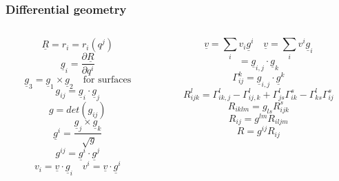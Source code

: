 \documentclass[first,firstsupp,lastsupp,handout,last,hyperref,table]{ETHclass}
\begin{document}
\begin{frame}[t]
\frametitle{Differential geometry}
\vspace{-0.1cm}
\centering
{\footnotesize
\begin{columns}
\begin{column}{0.5\textwidth}
\begin{equation*}
\underline{R}=r_{i}=r_{i}(q^{j})
\end{equation*}
\begin{equation*}
\underline{g}_{i}=\frac{\partial\underline{R}}{\partial q^{i}}
\end{equation*}
\begin{equation*}
\underline{g}_{3}=\underline{g}_{1}\times\underline{g}_{2}\quad\text{for surfaces}
\end{equation*}
\begin{equation*}
g_{ij}=\underline{g}_{i}\cdotp\underline{g}_{j}
\end{equation*}
\begin{equation*}
g=det(g_{ij})
\end{equation*}
\begin{equation*}
\underline{g}^{i}=\frac{\underline{g}_{j}\times\underline{g}_{k}}{\sqrt[]{g}}
\end{equation*}
\begin{equation*}
g^{ij}=\underline{g}^{i}\cdotp\underline{g}^{j}
\end{equation*}
\begin{equation*}
v_{i}=\underline{v}\cdotp\underline{g}_{i}\quad v^{i}=\underline{v}\cdotp\underline{g}^{i}
\end{equation*}
\end{column}
\begin{column}{0.5\textwidth}
\begin{equation*}
\underline{v}=\sum_{i}v_{i}\underline{g}^{i}\quad \underline{v}=\sum_{i}v^{i}\underline{g}_{i}
\end{equation*}
\begin{equation*}
[ij,k]=\underline{g}_{i,j}\cdotp\underline{g}_{k}
\end{equation*}
\begin{equation*}
\Gamma^{k}_{ij}=\underline{g}_{i,j}\cdotp\underline{g}^{k}
\end{equation*}
\begin{equation*}
R^{l}_{ijk}=\Gamma^{l}_{ik,j}-\Gamma^{l}_{ij,k}+\Gamma^{l}_{js}\Gamma^{s}_{ik}-\Gamma^{l}_{ks}\Gamma^{s}_{ij}
\end{equation*}
\begin{equation*}
R_{iklm}=g_{ls}R^{s}_{ijk}
\end{equation*}
\begin{equation*}
R_{ij}=g^{lm}R_{iljm}
\end{equation*}
\begin{equation*}
R=g^{ij}R_{ij}
\end{equation*}
\end{column}
\end{columns}
}
\end{frame}
\end{document}
